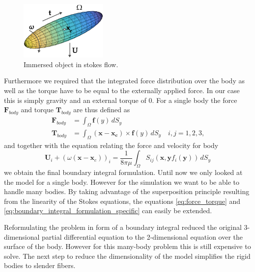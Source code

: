 \documentclass[a4paper,11pt]{kth-mag}
\begin{document}
\begin{figure}[!htbp]
  \centering
  \includegraphics[width=0.3819660112501450000000\textwidth]{img/immersed_rigid.png}
  \caption{Immersed object in stokes flow.}
  \label{fig:immersed_rigid}
\end{figure}

Furthermore we required that the integrated force distribution over the body as well as the torque have to be equal to the externally applied force. In our case this is simply gravity and an external torque of $0$. For a single body the force $\mathbf{F}_{body}$ and torque $\mathbf{T}_{body}$ are thus defined as
\begin{equation}
  \label{eq:force_torque}
  \begin{aligned}
    \mathbf{F}_{body} &= \int_\Omega \mathbf{f}(y) \, dS_y \\
    \mathbf{T}_{body} &= \int_\Omega (\mathbf{x} - \mathbf{x_c}) \times \mathbf{f}(y) \, dS_y \quad i,j=1,2,3\text{,}
  \end{aligned}
\end{equation}
and together with the equation relating the force and velocity for body
\begin{equation}
  \label{eq:boundary_integral_formulation_specific}
  \mathbf{U}_i + (\omega (\mathbf{x} - \mathbf{x}_c))_i = \frac{1}{8\pi\mu} \int_\Omega S_{ij}(\mathbf{x},\mathbf{y} f_i(\mathbf{y}))  \, dS_y
\end{equation}
we obtain the final boundary integral formulation. Until now we only looked at the model for a single body. However for the simulation we want to be able to handle many bodies. By taking advantage of the superposition principle resulting from the linearity of the Stokes equations, the equations \eqref{eq:force_torque} and \eqref{eq:boundary_integral_formulation_specific} can easily be extended.

Reformulating the problem in form of a boundary integral reduced the original 3-dimensional partial differential equation to the 2-dimensional equation over the surface of the body. However for this many-body problem this is still expensive to solve. The next step to reduce the dimensionality of the model simplifies the rigid bodies to slender fibers.
\end{document}
